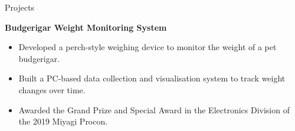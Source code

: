 \documentclass{resume} %
\begin{document}
\begin{rSection}{Projects}

{\bf Budgerigar Weight Monitoring System }
    \begin{itemize}
        \vspace{-0.3cm}\item Developed a perch-style weighing device to monitor the weight of a pet budgerigar.
        \vspace{-0.3cm}\item Built a PC-based data collection and visualisation system to track weight changes over time.
        \vspace{-0.3cm}\item Awarded the Grand Prize and Special Award in the Electronics Division of the 2019 Miyagi Procon.
    \end{itemize}
\end{rSection}
\end{document}
